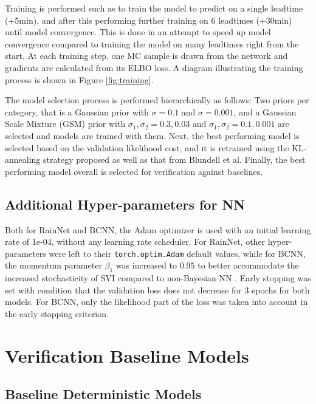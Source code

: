 Training is performed such as to train the model to predict on a single leadtime (+5min), and after this performing further training on 6 leadtimes (+30min) until model convergence. This is done in an attempt to speed up model convergence compared to training the model on many leadtimes right from the start. At each training step, one MC sample is drawn from the network and gradients are calculated from its ELBO loss. A diagram illustrating the training process is shown in Figure \ref{fig:training}.

The model selection process is performed hierarchically as follows: Two priors per category, that is a Gaussian prior with $\sigma = 0.1$ and $\sigma = 0.001$, and a Gaussian Scale Mixture (GSM) prior with $\sigma_1, \sigma_2 = 0.3, 0.03$ and   $\sigma_1, \sigma_2 = 0.1, 0.001$ are selected and models are trained with them. Next, the best performing model is selected based on the validation likelihood cost, and it is retrained using the KL-annealing strategy proposed as well as that from Blundell et al. Finally, the best performing model overall is selected for verification against baselines. 

\subsection{Additional Hyper-parameters for NN}
\label{section:hyper}
 Both for RainNet and BCNN, the Adam optimizer is used with an initial learning rate of 1e-04, without any learning rate scheduler. For RainNet, other hyper-parameters were left to their \texttt{torch.optim.Adam} default values, while for BCNN, the momentum parameter $\beta_1$ was increased to $0.95$ to better accommodate the increased stochasticity of SVI compared to non-Bayesian NN \cite{noauthor_svi_nodate}. Early stopping was set with condition that the validation loss does not decrease for 3 epochs for both models. For BCNN, only the likelihood part of the loss was taken into account in the early stopping criterion. 


\section{Verification Baseline Models}

\subsection{Baseline Deterministic Models}
\label{section:det_model}

